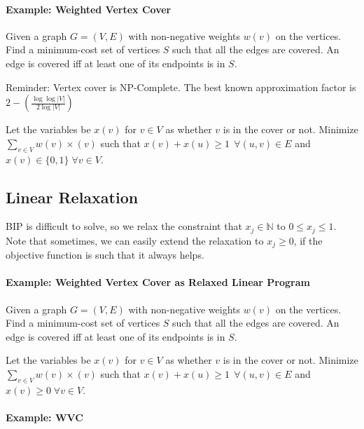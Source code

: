\documentclass[a4paper]{article}
\begin{document}
\paragraph{Example: Weighted Vertex Cover}
Given a graph $G=(V,E)$ with non-negative weights $w(v)$ on the vertices.
Find a minimum-cost set of vertices $S$ such that all the edges are covered.
An edge is covered iff at least one of its endpoints is in $S$.

Reminder: Vertex cover is NP-Complete. The best known approximation factor is $2-\left( \frac{\log \log |V|}{2 \log |V|} \right)$

Let the variables be $x(v)$ for $v\in V$ as whether $v$ is in the cover or not.
Minimize $\sum_{v\in V} w(v) \times (v)$ such that $x(v) + x(u) \ge 1 \;\, \forall (u,v) \in E$ and $x(v) \in \{0,1\} \; \forall v\in V$.

\subsection{Linear Relaxation}
BIP is difficult to solve, so we relax the constraint that $x_j \in \mathbb{N}$ to $0 \le x_j \le 1$. Note that sometimes, we can easily extend the relaxation to $x_j \ge 0$, if the objective function is such that it always helps.

\paragraph{Example: Weighted Vertex Cover as Relaxed Linear Program}
Given a graph $G=(V,E)$ with non-negative weights $w(v)$ on the vertices.
Find a minimum-cost set of vertices $S$ such that all the edges are covered.
An edge is covered iff at least one of its endpoints is in $S$.

Let the variables be $x(v)$ for $v\in V$ as whether $v$ is in the cover or not.
Minimize $\sum_{v\in V} w(v) \times (v)$ such that $x(v) + x(u) \ge 1 \;\, \forall (u,v) \in E$ and $x(v) \ge 0 \; \forall v\in V$.

\paragraph{Example: WVC}\ \\
\begin{figure}[h!]
\centering
{}
\end{figure}
\end{document}

